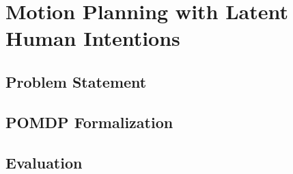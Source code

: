 \chapter{Motion Planning with Latent Human Intentions}\label{chap:motion-planning-hri}

\section{Problem Statement}
\section{POMDP Formalization}
\section{Evaluation}
